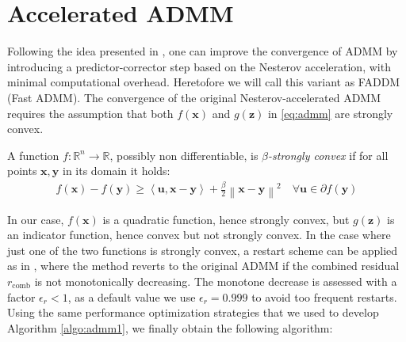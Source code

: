 \documentclass[AMA,STIX1COL]{WileyNJD-v2}
\newcommand{\vect}[1]{\bm{#1}}
\newcommand{\norm}[1]{\left\lVert#1\right\rVert}
\begin{document}
\section{Accelerated ADMM}

Following the idea presented in \cite{Goldstein2014}, one can improve the convergence of ADMM by introducing a predictor-corrector step based on the Nesterov acceleration, with minimal computational overhead. Heretofore we will call this variant as FADDM (Fast ADMM). 
The convergence of the original Nesterov-accelerated ADMM requires the assumption that both $f(\vect{x})$ and $g(\vect{z})$ in \eqref{eq:admm} are strongly convex.

\begin{definition}
A function $f: \mathbb{R}^n \rightarrow \mathbb{R}$, possibly non differentiable, is \textit{$\beta$-strongly convex} if for all points $\vect{x},\vect{y}$ in its domain it holds:
\begin{align}
\label{eq:strongconvex}
f(\vect{x}) - f(\vect{y}) \geq \left\langle \vect{u}, \vect{x} - \vect{y}  \right\rangle + \frac{\beta}{2} \norm{ \vect{x} - \vect{y} }^2
 \quad \forall \vect{u} \in \partial f(\vect{y})
\end{align}
\end{definition}

In our case, $f(\vect{x})$ is a quadratic function, hence strongly convex, but $g(\vect{z})$ is an indicator function, hence convex but not strongly convex. In the case where just one of the two functions is strongly convex, a restart scheme can be applied as in \cite{Goldstein2014}, where the method reverts to the original ADMM if the combined residual $r_{\text{comb}}$ is not monotonically decreasing. The monotone decrease is assessed with a factor $\epsilon_r < 1$, as a default value we use 
$\epsilon_r =0.999$ to avoid too frequent restarts. 
Using the same performance optimization strategies that we used to develop Algorithm \ref{algo:admm1}, we finally obtain the following algorithm:
\end{document}
